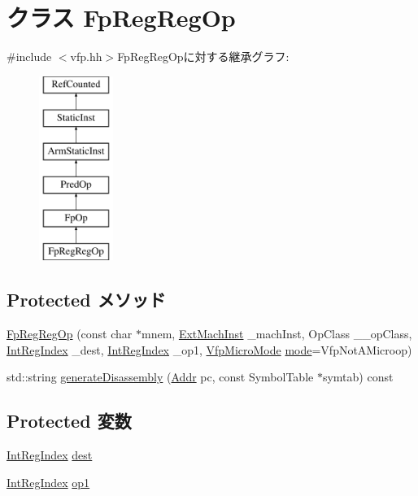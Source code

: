 \hypertarget{classArmISA_1_1FpRegRegOp}{
\section{クラス FpRegRegOp}
\label{classArmISA_1_1FpRegRegOp}
}


{\ttfamily \#include $<$vfp.hh$>$}FpRegRegOpに対する継承グラフ:\begin{figure}[H]
\begin{center}
\leavevmode
\includegraphics[height=6cm]{classArmISA_1_1FpRegRegOp}
\end{center}
\end{figure}
\subsection*{Protected メソッド}
\begin{DoxyCompactItemize}
\item 
\hyperlink{classArmISA_1_1FpRegRegOp_a54d3cb83ccd4f76c46dd318a0519f58f}{FpRegRegOp} (const char $\ast$mnem, \hyperlink{classStaticInst_a5605d4fc727eae9e595325c90c0ec108}{ExtMachInst} \_\-machInst, OpClass \_\-\_\-opClass, \hyperlink{namespaceArmISA_ae64680ba9fb526106829d6bf92fc791b}{IntRegIndex} \_\-dest, \hyperlink{namespaceArmISA_ae64680ba9fb526106829d6bf92fc791b}{IntRegIndex} \_\-op1, \hyperlink{namespaceArmISA_ad386ea556acd7cd538c64e2d73933714}{VfpMicroMode} \hyperlink{namespaceArmISA_a5f3b9b97eb2dfa29d33e74878455f90d}{mode}=VfpNotAMicroop)
\item 
std::string \hyperlink{classArmISA_1_1FpRegRegOp_a95d323a22a5f07e14d6b4c9385a91896}{generateDisassembly} (\hyperlink{classm5_1_1params_1_1Addr}{Addr} pc, const SymbolTable $\ast$symtab) const 
\end{DoxyCompactItemize}
\subsection*{Protected 変数}
\begin{DoxyCompactItemize}
\item 
\hyperlink{namespaceArmISA_ae64680ba9fb526106829d6bf92fc791b}{IntRegIndex} \hyperlink{classArmISA_1_1FpRegRegOp_aec72e8e45bdc87abeeeb75d2a8a9a716}{dest}
\item 
\hyperlink{namespaceArmISA_ae64680ba9fb526106829d6bf92fc791b}{IntRegIndex} \hyperlink{classArmISA_1_1FpRegRegOp_a4c465c43ad568f8bcf8ae71480e9cfea}{op1}
\end{DoxyCompactItemize}


